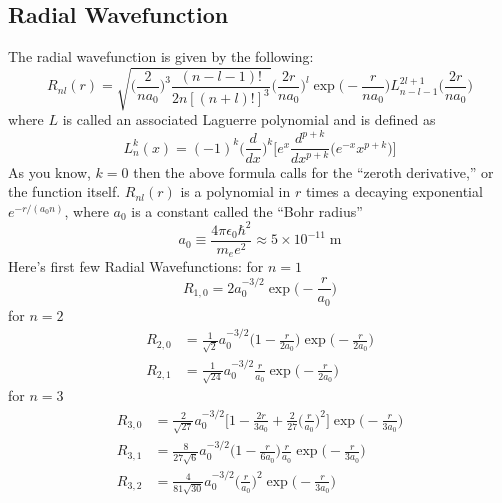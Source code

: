 \documentclass[../../../main.tex]{subfiles}
\begin{document}
\subsection{Radial Wavefunction}
The radial wavefunction is given by the following:
\begin{equation*}
    R_{nl}(r)=\sqrt{ \bigg(\frac{2}{na_0}\bigg)^3 \frac{(n - l - 1)!}{2n[(n + l)! ]^3}} \bigg(\frac{2r}{na_0}\bigg)^l \exp \biggl( - \frac{r}{na_0} \biggr) L_{n-l-1}^{2l+1}\biggl(\frac{2r}{na_0}\biggr)
\end{equation*}
where $L$ is called an associated Laguerre polynomial and is defined as
\begin{equation*}
    L_n^{k}(x) =(-1)^k\biggl(\frac{d}{dx}\biggr)^k\biggl[ e^x \frac{d^{p+k}}{dx^{p+k}}\bigl(e^{-x}x^{p+k}\bigr) \biggr]
\end{equation*}
As you know,  $k = 0$ then the above formula calls for the “zeroth derivative,” or the function itself. $ R_{nl}(r)$ is a polynomial in $r$ times a decaying exponential $e^{-r/(a_0n)}$, where $a_0$ is a constant called the “Bohr radius”
\begin{equation*}
    a_0\equiv \frac{4\pi \epsilon_0\hbar^2}{m_e e^2}\approx 5 \times 10^{-11} \;\text{m}
\end{equation*}
Here's first few Radial Wavefunctions: for $n=1$
\begin{equation*}
    R_{1,0}=2a_0^{-3/2}\exp \biggl(-\frac{r}{a_0}\biggr)
\end{equation*}
for $n=2$
\begin{align*}
    R_{2,0}&=\frac{1}{\sqrt{2}}a_0^{-3/2}\biggl(1-\frac{r}{2a_0}\biggr) \exp \biggl(-\frac{r}{2a_0}\biggr)\\
    R_{2,1}&=\frac{1}{\sqrt{24}}a_0^{-3/2} \frac{r}{a_0} \exp \biggl(-\frac{r}{2a_0}\biggr)
\end{align*}
for $n=3$
\begin{align*}
    R_{3,0}&=\frac{2}{\sqrt{27}} a_0^{-3/2} \biggl[1-\frac{2r}{3a_0}+\frac{2}{27}\biggl(\frac{r}{a_0}\biggr)^2 \biggr] \exp \biggl(-\frac{r}{3a_0}\biggr)\\
    R_{3,1}&=\frac{8}{27\sqrt{6}} a_0^{-3/2} \biggl(1-\frac{r}{6a_0}\biggr)\frac{r}{a_0} \exp \biggl(-\frac{r}{3a_0}\biggr)\\
    R_{3,2}&=\frac{4}{81\sqrt{30}} a_0^{-3/2} \biggl(\frac{r}{a_0}\biggr)^2 \exp \biggl(-\frac{r}{3a_0}\biggr)\\
\end{align*}
\end{document}
